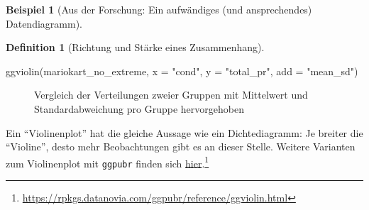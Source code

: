 \documentclass[
  a4paper,
]{scrbook}
\newenvironment{Shaded}{\begin{snugshade}}{\end{snugshade}}
\newcommand{\AttributeTok}[1]{\textcolor[rgb]{0.40,0.45,0.13}{#1}}
\newcommand{\FunctionTok}[1]{\textcolor[rgb]{0.28,0.35,0.67}{#1}}
\newcommand{\NormalTok}[1]{\textcolor[rgb]{0.00,0.23,0.31}{#1}}
\newcommand{\StringTok}[1]{\textcolor[rgb]{0.13,0.47,0.30}{#1}}
\theoremstyle{definition}
\newtheorem{example}{Beispiel}[chapter]
\theoremstyle{definition}
\newtheorem{definition}{Definition}[chapter]
\theoremstyle{definition}
\theoremstyle{remark}
\begin{document}
\begin{example}[Aus der Forschung: Ein aufwändiges (und ansprechendes)
Datendiagramm]
\begin{definition}[Richtung und Stärke eines
Zusammenhang]
\begin{Shaded}
\begin{Highlighting}[]
\FunctionTok{ggviolin}\NormalTok{(mariokart\_no\_extreme, }
         \AttributeTok{x =} \StringTok{"cond"}\NormalTok{, }
         \AttributeTok{y =} \StringTok{"total\_pr"}\NormalTok{,}
         \AttributeTok{add =} \StringTok{"mean\_sd"}\NormalTok{) }
\end{Highlighting}
\end{Shaded}

\begin{figure}[H]


\caption{\label{fig-comp-means-ggpubr}Vergleich der Verteilungen zweier
Gruppen mit Mittelwert und Standardabweichung pro Gruppe hervorgehoben}

\end{figure}%

Ein ``Violinenplot'' hat die gleiche Aussage wie ein Dichtediagramm: Je
breiter die ``Violine'', desto mehr Beobachtungen gibt es an dieser
Stelle. Weitere Varianten zum Violinenplot mit \texttt{ggpubr} finden
sich
\href{https://rpkgs.datanovia.com/ggpubr/reference/ggviolin.html}{hier}.\footnote{\url{https://rpkgs.datanovia.com/ggpubr/reference/ggviolin.html}}


\end{definition}
\end{example}
\end{document}
